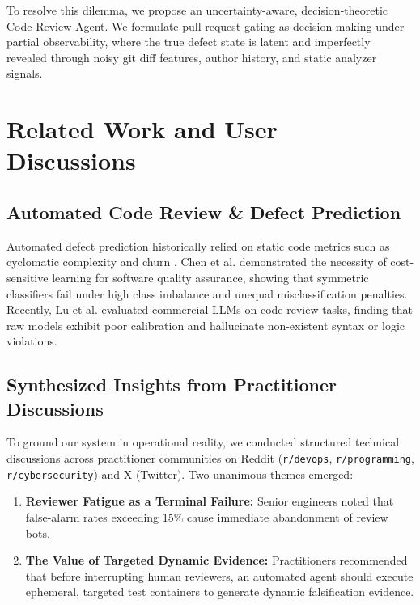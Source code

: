 \documentclass[10pt,twocolumn,letterpaper]{article}
\begin{document}
To resolve this dilemma, we propose an uncertainty-aware, decision-theoretic Code Review Agent. We formulate pull request gating as decision-making under partial observability, where the true defect state is latent and imperfectly revealed through noisy git diff features, author history, and static analyzer signals.

\section{Related Work and User Discussions}
\subsection{Automated Code Review \& Defect Prediction}
Automated defect prediction historically relied on static code metrics such as cyclomatic complexity and churn \cite{allamanis2018survey}. Chen et al. \cite{chen2017cost} demonstrated the necessity of cost-sensitive learning for software quality assurance, showing that symmetric classifiers fail under high class imbalance and unequal misclassification penalties. Recently, Lu et al. \cite{lu2024can} evaluated commercial LLMs on code review tasks, finding that raw models exhibit poor calibration and hallucinate non-existent syntax or logic violations.

\subsection{Synthesized Insights from Practitioner Discussions}
To ground our system in operational reality, we conducted structured technical discussions across practitioner communities on Reddit (\texttt{r/devops}, \texttt{r/programming}, \texttt{r/cybersecurity}) and X (Twitter). Two unanimous themes emerged:
\begin{enumerate}
    \item \textbf{Reviewer Fatigue as a Terminal Failure:} Senior engineers noted that false-alarm rates exceeding 15\% cause immediate abandonment of review bots.
    \item \textbf{The Value of Targeted Dynamic Evidence:} Practitioners recommended that before interrupting human reviewers, an automated agent should execute ephemeral, targeted test containers to generate dynamic falsification evidence.
\end{enumerate}
\end{document}
